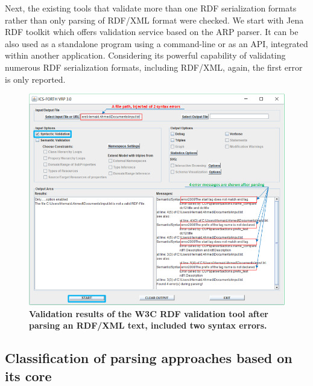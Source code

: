 \par Next, the existing tools that validate more than one  RDF serialization formats rather than only parsing of RDF/XML format were checked. We start with Jena RDF toolkit \cite{McBride:2002:JSW:613357.613755} which offers validation service based on the ARP parser. It can  be also used as a standalone program using a command-line  or as an API, integrated within another application. Considering its powerful capability of validating numerous RDF serialization formats, including RDF/XML, again, the first error is only reported.
 \begin{figure}[ht]
		\begin{center}
			\setlength\belowcaptionskip{-7mm}
			\includegraphics[scale=0.7,angle=0]{images/VRPErrorResult.png}
			\caption{\textbf{Validation results of the W3C RDF validation tool \cite{W3C:Validation:Online} after parsing an RDF/XML text, included two syntax errors.} }
			\label{Fig:VRPErrorResult}
		\end{center}
	\end{figure}
\subsection{Classification of parsing approaches based on its core}

